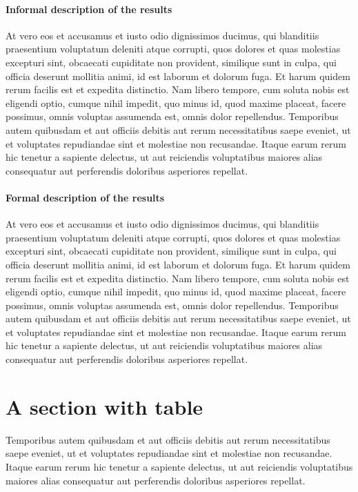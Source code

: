 \documentclass[letterpaper,12pt,leqno]{article}
\begin{document}
\paragraph{Informal description of the results} At vero eos et accusamus et iusto odio dignissimos ducimus, qui blanditiis praesentium voluptatum deleniti atque corrupti, quos dolores et quas molestias excepturi sint, obcaecati cupiditate non provident, similique sunt in culpa, qui officia deserunt mollitia animi, id est laborum et dolorum fuga. Et harum quidem rerum facilis est et expedita distinctio. Nam libero tempore, cum soluta nobis est eligendi optio, cumque nihil impedit, quo minus id, quod maxime placeat, facere possimus, omnis voluptas assumenda est, omnis dolor repellendus. Temporibus autem quibusdam et aut officiis debitis aut rerum necessitatibus saepe eveniet, ut et voluptates repudiandae sint et molestiae non recusandae. Itaque earum rerum hic tenetur a sapiente delectus, ut aut reiciendis voluptatibus maiores alias consequatur aut perferendis doloribus asperiores repellat. 

\paragraph{Formal description of the results} At vero eos et accusamus et iusto odio dignissimos ducimus, qui blanditiis praesentium voluptatum deleniti atque corrupti, quos dolores et quas molestias excepturi sint, obcaecati cupiditate non provident, similique sunt in culpa, qui officia deserunt mollitia animi, id est laborum et dolorum fuga. Et harum quidem rerum facilis est et expedita distinctio. Nam libero tempore, cum soluta nobis est eligendi optio, cumque nihil impedit, quo minus id, quod maxime placeat, facere possimus, omnis voluptas assumenda est, omnis dolor repellendus. Temporibus autem quibusdam et aut officiis debitis aut rerum necessitatibus saepe eveniet, ut et voluptates repudiandae sint et molestiae non recusandae. Itaque earum rerum hic tenetur a sapiente delectus, ut aut reiciendis voluptatibus maiores alias consequatur aut perferendis doloribus asperiores repellat. 

\section{A section with table}

Temporibus autem quibusdam et aut officiis debitis aut rerum necessitatibus saepe eveniet, ut et voluptates repudiandae sint et molestiae non recusandae. Itaque earum rerum hic tenetur a sapiente delectus, ut aut reiciendis voluptatibus maiores alias consequatur aut perferendis doloribus asperiores repellat. 
\end{document}
